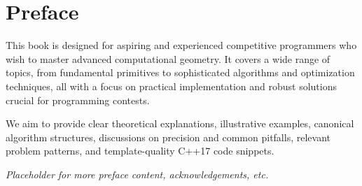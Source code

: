 \chapter*{Preface}
\label{chap:preface}

This book is designed for aspiring and experienced competitive programmers who wish to master advanced computational geometry. It covers a wide range of topics, from fundamental primitives to sophisticated algorithms and optimization techniques, all with a focus on practical implementation and robust solutions crucial for programming contests.

We aim to provide clear theoretical explanations, illustrative examples, canonical algorithm structures, discussions on precision and common pitfalls, relevant problem patterns, and template-quality C++17 code snippets.

\textit{Placeholder for more preface content, acknowledgements, etc.}

\cleardoublepage